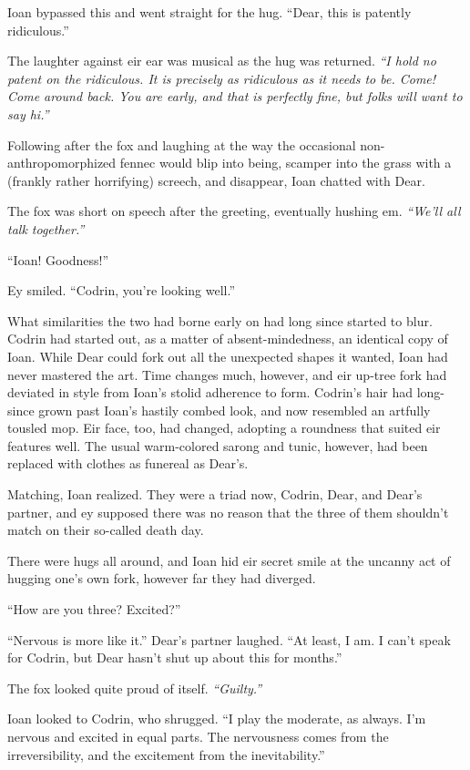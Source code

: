 Ioan bypassed this and went straight for the hug. ``Dear, this is patently ridiculous.''

The laughter against eir ear was musical as the hug was returned. \emph{``I hold no patent on the ridiculous. It is precisely as ridiculous as it needs to be. Come! Come around back. You are early, and that is perfectly fine, but folks will want to say hi.''}

Following after the fox and laughing at the way the occasional non-anthropomorphized fennec would blip into being, scamper into the grass with a (frankly rather horrifying) screech, and disappear, Ioan chatted with Dear.

The fox was short on speech after the greeting, eventually hushing em. \emph{``We'll all talk together.''}

``Ioan! Goodness!''

Ey smiled. ``Codrin, you're looking well.''

What similarities the two had borne early on had long since started to blur. Codrin had started out, as a matter of absent-mindedness, an identical copy of Ioan. While Dear could fork out all the unexpected shapes it wanted, Ioan had never mastered the art. Time changes much, however, and eir up-tree fork had deviated in style from Ioan's stolid adherence to form. Codrin's hair had long-since grown past Ioan's hastily combed look, and now resembled an artfully tousled mop. Eir face, too, had changed, adopting a roundness that suited eir features well. The usual warm-colored sarong and tunic, however, had been replaced with clothes as funereal as Dear's.

Matching, Ioan realized. They were a triad now, Codrin, Dear, and Dear's partner, and ey supposed there was no reason that the three of them shouldn't match on their so-called death day.

There were hugs all around, and Ioan hid eir secret smile at the uncanny act of hugging one's own fork, however far they had diverged.

``How are you three? Excited?''

``Nervous is more like it.'' Dear's partner laughed. ``At least, I am. I can't speak for Codrin, but Dear hasn't shut up about this for months.''

The fox looked quite proud of itself. \emph{``Guilty.''}

Ioan looked to Codrin, who shrugged. ``I play the moderate, as always. I'm nervous and excited in equal parts. The nervousness comes from the irreversibility, and the excitement from the inevitability.''

